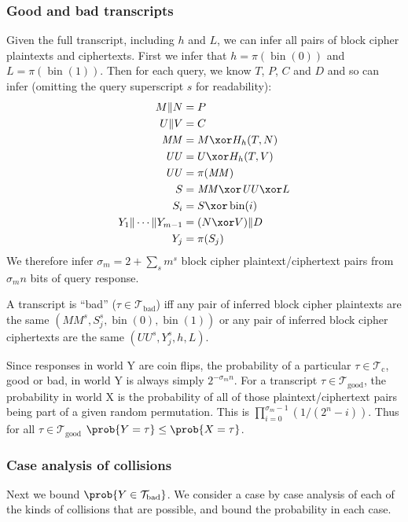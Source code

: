\documentclass[letterpaper,11pt]{article}
\newcommand*{\Concat}{\Vert}
\newcommand*{\MM}{\mathit{MM}}
\newcommand*{\Tb}{\mathcal{T}_\mathrm{bad}}
\newcommand*{\Tc}{\mathcal{T}_\mathrm{c}}
\newcommand*{\Tg}{\mathcal{T}_\mathrm{good}}
\newcommand*{\UU}{\mathit{UU}}
\DeclareMathOperator{\fromint}{bin}
\begin{document}
\subsubsection{Good and bad transcripts}
Given the full transcript, including \(h\) and \(L\),
we can infer all pairs of block cipher plaintexts and ciphertexts.
First we infer that \(h = \pi(\fromint(0))\) and \(L = \pi(\fromint(1))\).
Then for each query, we know \(T\), \(P\), \(C\) and \(D\)
and so can infer
(omitting the query superscript \(s\) for readability):
\begin{align*}
    M \Concat N &= P \\
    U \Concat V &= C \\
    \MM &= M \xor H_h(T, N)\\
    \UU &= U \xor H_h(T, V)\\
    \UU &= \pi(\MM)\\
    S &= \MM \xor \UU \xor L\\ 
    S_i &= S \xor \fromint(i)\\
    Y_1 \Concat \cdots \Concat Y_{m-1} &= (N \xor V) \Concat D \\
    Y_j &= \pi(S_j) \\
\end{align*}
We therefore infer \(\sigma_m = 2 + \sum_s m^s \) block cipher
plaintext/ciphertext pairs from \(\sigma_m n\) bits of query response.

A transcript is ``bad'' (\(\tau \in \Tb\)) iff any pair of 
inferred block cipher plaintexts are the same
\((\MM^s, S_j^s, \fromint(0), \fromint(1))\)
or any pair of inferred block cipher ciphertexts are the same
\((\UU^s, Y_j^s, h, L)\).

Since responses in world Y are coin flips,
the probability of a 
particular \(\tau \in \Tc\), good or bad,
in world Y is always simply \(2^{-\sigma_m n}\).
For a transcript \(\tau \in \Tg\),
the probability in world X
is the probability of all of those plaintext/ciphertext
pairs being part of a given random permutation.
This is 
\(\prod_{i=0}^{\sigma_m -1}(1/(2^n - i))\).
Thus for all \(\tau \in \Tg\)
\(\prob{Y = \tau} \leq \prob{X = \tau}\). 

\subsubsection{Case analysis of collisions}
Next we bound \(\prob{Y \in \Tb}\).
We consider a case by case analysis of
each of the kinds of collisions that are
possible, and bound the probability in each case.
\end{document}
